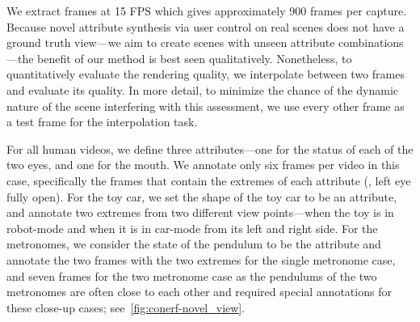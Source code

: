       We extract frames at 15 FPS which gives approximately 900 frames per capture.
      Because novel attribute synthesis via user control on real scenes does not
      have a ground truth view---we aim to create scenes with unseen attribute
      combinations---the benefit of our method is best seen qualitatively.
      Nonetheless, to quantitatively evaluate the rendering quality, we interpolate
      between two frames and evaluate its quality.
      In more detail, to minimize the chance of the dynamic nature of the scene
      interfering with this assessment, we use every other frame as a test frame for
      the interpolation task.

      For all human videos, we define three attributes---one for the status of each
      of the two eyes, and one for the mouth.
      We annotate only six frames per video in this case, specifically the frames
      that contain the extremes of each attribute (\eg, left eye fully open).
      For the toy car, we set the shape of the toy car to be an attribute, and
      annotate two extremes from two different view points---when the toy is in
      robot-mode and when it is in car-mode from its left and right side.
      For the metronomes, we consider the state of the pendulum to be the attribute
      and annotate the two frames with the two extremes for the single metronome
      case, and seven frames for the two metronome case as the pendulums of the two
      metronomes are often close to each other and required special annotations for
      these close-up cases; see~\cref{fig:conerf-novel_view}.

